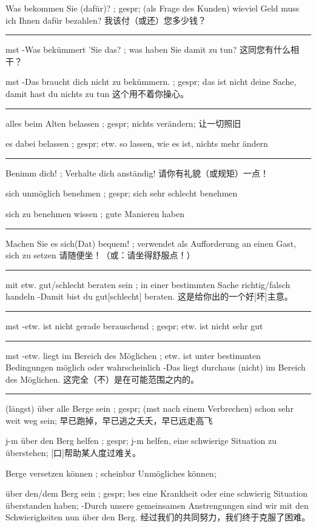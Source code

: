 Was bekommen Sie (dafür)? ; gespr; (als Frage des Kunden) wieviel Geld muss ich Ihnen dafür bezahlen?
我该付（或还）您多少钱？

\noindent\rule{\textwidth}{1pt} 
mst -Was bekümmert 'Sie das? ; was haben Sie damit zu tun?
这同您有什么相干？

mst -Das braucht dich nicht zu bekümmern. ; gespr; das ist nicht deine Sache, damit hast du nichts zu tun
这个用不着你操心。

\noindent\rule{\textwidth}{1pt} 
alles beim Alten belassen ; gespr; nichts verändern;
让一切照旧

es dabei belassen ; gespr; etw. so lassen, wie es ist, nichts mehr ändern

\noindent\rule{\textwidth}{1pt} 
Benimm dich! ; Verhalte dich anständig!
请你有礼貌（或规矩）一点！

sich unmöglich benehmen ; gespr; sich sehr schlecht benehmen 

sich zu benehmen wissen ; gute Manieren haben

\noindent\rule{\textwidth}{1pt} 
Machen Sie es sich(Dat) bequem! ; verwendet als Aufforderung an einen Gast, sich zu setzen
请随便坐！（或：请坐得舒服点！）

\noindent\rule{\textwidth}{1pt} 
mit etw. gut/schlecht beraten sein ; in einer bestimmten Sache richtig/falsch handeln
-Damit bist du gut[schlecht] beraten. 这是给你出的一个好[坏]主意。

\noindent\rule{\textwidth}{1pt}
mst -etw. ist nicht gerade berauschend ; gespr; etw. ist nicht sehr gut

\noindent\rule{\textwidth}{1pt} 
mst -etw. liegt im Bereich des Möglichen ; etw. ist unter bestimmten Bedingungen möglich oder wahrscheinlich
-Das liegt durchaus (nicht) im Bereich des Möglichen. 这完全（不）是在可能范围之内的。

\noindent\rule{\textwidth}{1pt} 
(längst) über alle Berge sein ; gespr; (mst nach einem Verbrechen) schon sehr weit weg sein;
早已跑掉，早已逃之夭夭，早已远走高飞

j-m über den Berg helfen ; gespr; j-m helfen, eine schwierige Situation zu überstehen;
[口]帮助某人度过难关。

Berge versetzen können ; scheinbar Unmögliches können;

über den/dem Berg sein ; gespr; bes eine Krankheit oder eine schwierig Situation überstanden haben;
-Durch unsere gemeinsamen Anstrengungen sind wir mit den Schwierigkeiten nun über den Berg. 经过我们的共同努力，我们终于克服了困难。

